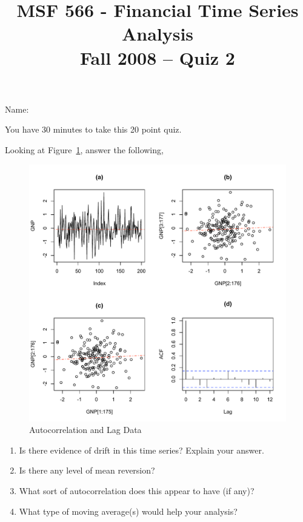 \documentclass[10pt]{article}
\begin{document}
\title{MSF 566 - Financial Time Series Analysis \\ Fall 2008 -- Quiz 2}
\date{}
\maketitle

{Name:} {\underline {\hspace{4.5in}}}
\vspace{1pc}

You have 30 minutes to take this 20 point quiz.
\begin{problem}{20}
\raggedright{Looking at Figure~\ref{figure:acf}, answer the following,}\linebreak

\begin{figure}[ht]  \centering  \includegraphics[scale=.45]{quiz-acf}  \caption{Autocorrelation and Lag Data}  \label{figure:acf}\end{figure}\end{problem}

\begin{enumerate}
\item Is there evidence of drift in this time series? Explain your answer.
\item Is there any level of mean reversion?
\item What sort of autocorrelation does this appear to have (if any)?
\item What type of moving average(s) would help your analysis?
\end{enumerate}
\thispagestyle{empty}
\end{document}
